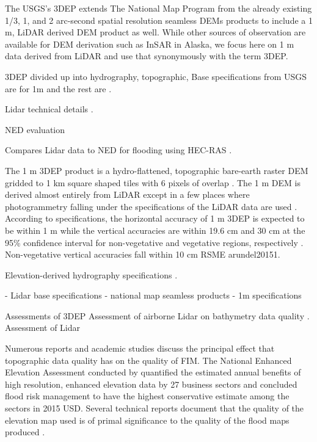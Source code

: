 \documentclass[preprint,review,12pt]{dependencies/elsarticle}
\begin{document}
The \ac{USGS}'s \ac{3DEP} extends The National Map Program from the already existing 1/3, 1, and 2 arc-second spatial resolution seamless \acp{DEM} products to include a 1 \ac{m}, \ac{LiDAR} derived \ac{DEM} product as well.
While other sources of observation are available for \ac{DEM} derivation such as \ac{InSAR} in Alaska, we focus here on 1 \ac{m} data derived from \ac{LiDAR} and use that synonymously with the term \ac{3DEP}.

3DEP divided up into hydrography, topographic, 
Base specifications from USGS are \citep{arundel20151} for 1m and the rest are \citep{archuleta2017national}.

Lidar technical details \citep{stoker2015usgs}.

NED evaluation \citep{gesch2014accuracy,dobbs2010evaluation}

Compares Lidar data to NED for flooding using HEC-RAS \citep{wang2005comparison}.

The 1 \ac{m} \ac{3DEP} product is a hydro-flattened, topographic bare-earth raster \ac{DEM} gridded to 1 \ac{km} square shaped tiles with 6 pixels of overlap \citep{arundel20151}.
The 1 \ac{m} \ac{DEM} is derived almost entirely from \ac{LiDAR} except in a few places where photogrammetry falling under the specifications of the \ac{LiDAR} data are used \citep{arundel20151}.
According to specifications, the horizontal accuracy of 1 \ac{m} \ac{3DEP} is expected to be within 1 \ac{m} while the vertical accuracies are within 19.6 \ac{cm} and 30 \ac{cm} at the 95\% confidence interval for non-vegetative and vegetative regions, respectively \citep{arundel20151}.
Non-vegetative vertical accuracies fall within 10 \ac{cm} \ac{RSME} \ac{arundel20151}.

Elevation-derived hydrography specifications \citep{terziotti2020elevation}.

- Lidar base specifications \citep{heidemann2012lidar}
- national map seamless products \citep{archuleta2017national}
- 1m specifications \citep{arundel20151}


Assessments of 3DEP \citep{stoker2022accuracy,kim2020positional,chirico2020evaluating,callahan2022vertical,scott2022statewide,dobbs2010evaluation}
Assessment of airborne Lidar on bathymetry data quality \citep{hilldale2008assessing}.
Assessment of Lidar \citep{tarolli2014high}

Numerous reports and academic studies discuss the principal effect that topographic data quality has on the quality of \ac{FIM}.
The National Enhanced Elevation Assessment conducted by \citet{dewberry2011final} quantified the estimated annual benefits of high resolution, enhanced elevation data by 27 business sectors and concluded flood risk management to have the highest conservative estimate among the sectors in 2015 \ac{USD}.
Several technical reports document that the quality of the elevation map used is of primal significance to the quality of the flood maps produced \citep{national2007elevation,national2009mapping}.
\end{document}
